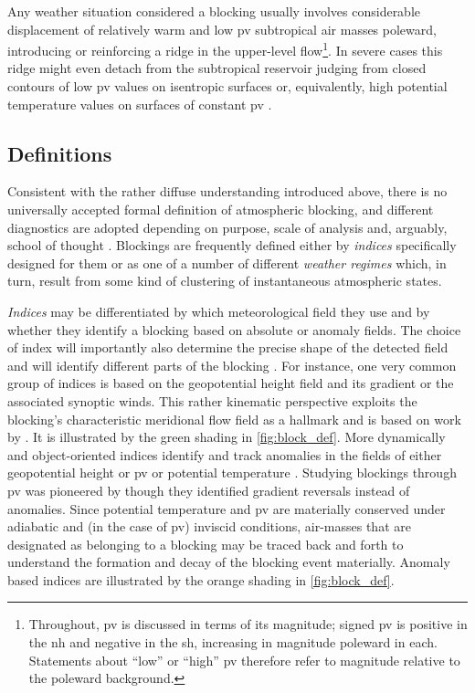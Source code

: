 Any weather situation considered a blocking usually involves considerable
displacement of relatively warm and low \gls{pv} subtropical air masses
poleward, introducing or reinforcing a ridge in the upper-level
flow\footnote{Throughout, \gls{pv} is discussed in terms of its magnitude;
    signed \gls{pv} is positive in the \gls{nh} and negative in the \gls{sh},
    increasing in magnitude poleward in each. Statements about \enquote{low} or
    \enquote{high} \gls{pv} therefore refer to magnitude relative to the poleward
    background.}. In severe
cases this ridge might even detach from the subtropical reservoir judging from
closed contours of low \gls{pv} values on isentropic surfaces or, equivalently,
high potential temperature values on surfaces of constant \gls{pv}
\parencite{pellyNewPerspectiveBlocking2003}.

\subsection{Definitions} \label{sec:intro_block_def}
Consistent with the rather diffuse understanding introduced above, there is no
universally accepted formal definition of atmospheric blocking, and different
diagnostics are adopted depending on purpose, scale of analysis and, arguably,
school of thought \parencite{barnesMethodologyComparisonBlocking2012,
    barriopedroApplicationBlockingDiagnosis2010}. Blockings are frequently defined
either by \emph{indices} specifically designed for them or as one of a number
of different \emph{weather regimes} which, in turn, result from some kind of
clustering of instantaneous atmospheric states.

\emph{Indices} may be differentiated by which meteorological field they use and by
whether they identify a blocking based on absolute or anomaly fields. The
choice of index will importantly also determine the precise shape of the
detected field and will identify different parts of the blocking
\parencite{pinheiroAtmosphericBlockingIntercomparison2019,
    barnesMethodologyComparisonBlocking2012}.
For instance, one very common group of indices is based on the
geopotential height field and its gradient or the associated synoptic winds.
This rather kinematic perspective exploits the blocking's characteristic
meridional flow field as a hallmark and is based on work by
\textcite{lejenasCharacteristicsNorthernHemisphere1983,
    tibaldiOperationalPredictabilityBlocking1990}. It is illustrated by the
green shading in \cref{fig:block_def}.
More dynamically and
object-oriented indices identify and track anomalies in the fields of either
geopotential
height or \gls{pv} or
potential temperature
\parencite{schwierzPerspicaciousIndicatorsAtmospheric2004}. Studying blockings
through \gls{pv} was
pioneered by \textcite{pellyNewPerspectiveBlocking2003} though they identified
gradient reversals instead of anomalies. Since potential temperature and
\gls{pv} are materially conserved under adiabatic and (in the case of \gls{pv})
inviscid conditions, air-masses that are designated as belonging to a blocking
may be traced back and forth to understand the formation and decay of the
blocking event materially. Anomaly based indices are illustrated by the
orange shading in \cref{fig:block_def}.

